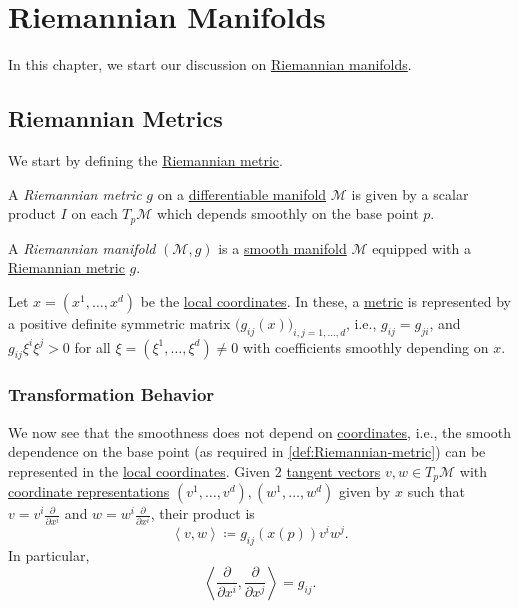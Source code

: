 \chapter{Riemannian Manifolds}
In this chapter, we start our discussion on \hyperref[def:Riemannian-manifold]{Riemannian manifolds}.

\section{Riemannian Metrics}
We start by defining the \hyperref[def:Riemannian-metric]{Riemannian metric}.

\begin{definition}\label{def:Riemannian-metric}
	A \emph{Riemannian metric} \(g\) on a \hyperref[def:smooth-manifold]{differentiable manifold} \(\mathcal{M} \) is given by a scalar product \(I\) on each \(T_p \mathcal{M} \) which depends smoothly on the base point \(p\).
\end{definition}

\begin{definition}\label{def:Riemannian-manifold}
	A \emph{Riemannian manifold} \((\mathcal{M} , g)\) is a \hyperref[def:smooth-manifold]{smooth manifold} \(\mathcal{M} \) equipped with a \hyperref[def:Riemannian-metric]{Riemannian metric} \(g\).
\end{definition}

Let \(x=(x^1, \dots , x^d)\) be the \hyperref[def:coordinate-chart]{local coordinates}. In these, a \hyperref[def:Riemannian-metric]{metric} is represented by a positive definite symmetric matrix \(\big( g_{ij} (x) \big) _{i, j=1, \dots , d}\), i.e., \(g_{ij} = g_{ji} \), and \(g_{ij} \xi ^i \xi ^j > 0\) for all \(\xi =(\xi ^1, \dots , \xi ^d) \neq 0\) with coefficients smoothly depending on \(x\).

\subsection{Transformation Behavior}
We now see that the smoothness does not depend on \hyperref[def:coordinate-chart]{coordinates}, i.e., the smooth dependence on the base point (as required in \autoref{def:Riemannian-metric}) can be represented in the \hyperref[def:coordinate-chart]{local coordinates}. Given \(2\) \hyperref[def:tangent-vector]{tangent vectors} \(v, w\in T_p \mathcal{M} \) with \hyperref[def:coordinate-chart]{coordinate representations} \((v^1, \dots , v^d), (w^1, \dots , w^d)\) given by \(x\) such that \(v = v^i \frac{\partial }{\partial x^i} \) and \(w = w^i \frac{\partial }{\partial x^i} \), their product is
\[
	\left\langle v, w \right\rangle \coloneqq g_{ij} (x(p)) v^i w^j.
\]
In particular,
\[
	\left\langle \frac{\partial }{\partial x^i} , \frac{\partial }{\partial x^j} \right\rangle = g_{ij} .
\]


